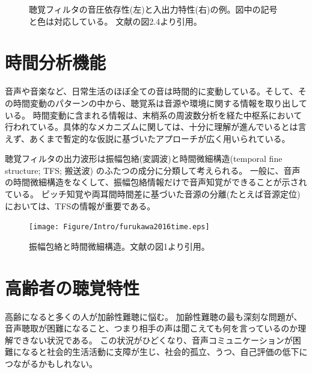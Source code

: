 \begin{figure}[h]
\begin{minipage}[t]{0.5\hsize}
        \label{fig:Basic_IOfunc}
    \end{minipage}
    \label{compression}
    \caption{聴覚フィルタの音圧依存性(左)と入出力特性(右)の例。図中の記号と色は対応している。
              文献\cite{yamamoto2023GESI}の図2.4より引用。}
\end{figure}

\newpage




\clearpage
\section{時間分析機能}
音声や音楽など、日常生活のほぼ全ての音は時間的に変動している。そして、その時間変動のパターンの中から、聴覚系は音源や環境に関する情報を取り出している。
時間変動に含まれる情報は、末梢系の周波数分析を経た中枢系において行われている。具体的なメカニズムに関しては、十分に理解が進んでいるとは言えず、あくまで暫定的な仮説に基づいたアプローチが広く用いられている。

聴覚フィルタの出力波形は振幅包絡(変調波)と時間微細構造(temporal fine structure; TFS; 搬送波) のふたつの成分に分類して考えられる。
一般に、音声の時間微細構造をなくして、振幅包絡情報だけで音声知覚ができることが示されている。
ピッチ知覚や両耳間時間差に基づいた音源の分離(たとえば音源定位)においては、TFSの情報が重要である。

\begin{figure}[h]
    \vspace{40pt}
    \hspace{20pt}
    \centering
    \texttt{[image: Figure/Intro/furukawa2016time.eps]}
    \caption{振幅包絡と時間微細構造。文献\cite{furukawa2016time}の図1より引用。}
\end{figure}



\clearpage
\section{高齢者の聴覚特性}
高齢になると多くの人が加齢性難聴に悩む。
加齢性難聴の最も深刻な問題が、音声聴取が困難になること、つまり相手の声は聞こえても何を言っているのか理解できない状況である。
この状況がひどくなり、音声コミュニケーションが困難になると社会的生活活動に支障が生じ、社会的孤立、うつ、自己評価の低下につながるかもしれない。


